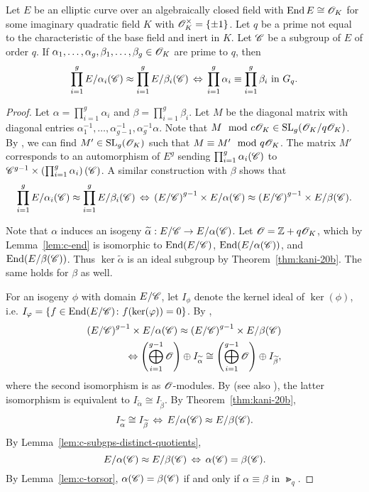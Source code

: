 \documentclass{amsart}
\begin{document}
\begin{lemma}\label{lem:prod-equiv-torsor}
  Let $E$ be an elliptic curve over an algebraically closed field with $\operatorname{End} E \cong \mathscr{O}_K$ for some imaginary quadratic field $K$ with $\mathscr{O}_K^\times = \{\pm 1\}$. Let $q$ be a prime not equal to the characteristic of the base field and inert in $K$. Let $\mathscr{C}$ be a subgroup of $E$ of order $q$. If $\alpha_1,\dots,\alpha_g,\beta_1,\dots,\beta_g \in \mathscr{O}_K$ are prime to $q$, then
  \[
    \prod_{i=1}^g E/\alpha_i(\mathscr{C}) \approx \prod_{i=1}^g E/\beta_i(\mathscr{C})
    \,\Leftrightarrow\,
    \prod_{i=1}^g \alpha_i \equiv \prod_{i=1}^g \beta_i \text{ in } G_q.
  \]
\end{lemma}
\begin{proof}
  Let $\alpha = \prod_{i=1}^g\alpha_i$ and $\beta = \prod_{i=1}^g\beta_i$. Let $M$ be the diagonal matrix with diagonal entries $\alpha_1^{-1},\dots,\alpha_{g-1}^{-1}, \alpha_g^{-1}\alpha$. Note that $M\mod{c\mathscr{O}_K} \in \operatorname{SL}_g(\mathscr{O}_K/q\mathscr{O}_K)$. By \cite[Cor.~5.2, Pg.~18]{ktheory1964bass}, we can find $M' \in \operatorname{SL}_g(\mathscr{O}_K)$ such that $M \equiv M' \mod{q\mathscr{O}_K}$. The matrix $M'$ corresponds to an automorphism of $E^g$ sending $\prod_{i=1}^g \alpha_i(\mathscr{C})$ to $\mathscr{C}^{g-1} \times \left(\prod_{i=1}^g \alpha_i\right)(\mathscr{C})$. A similar construction with $\beta$ shows that
  \[
    \prod_{i=1}^g E/\alpha_i(\mathscr{C}) \approx \prod_{i=1}^g E/\beta_i(\mathscr{C})
    \,\Leftrightarrow\,
    \left(E/\mathscr{C}\right)^{g-1} \times E/\alpha(\mathscr{C}) \approx \left(E/\mathscr{C}\right)^{g-1} \times E/\beta(\mathscr{C}).
  \]

  Note that $\alpha$ induces an isogeny $\widetilde{\alpha}: E/\mathscr{C} \to E/\alpha(\mathscr{C})$. Let $\mathscr{O} = \mathbb{Z} + q\mathscr{O}_K$, which by Lemma~\ref{lem:c-end} is isomorphic to $\operatorname{End}(E/\mathscr{C})$, $\operatorname{End}(E/\alpha(\mathscr{C}))$, and $\operatorname{End}(E/\beta(\mathscr{C}))$. Thus $\ker\tilde{\alpha}$ is an ideal subgroup by Theorem~\ref{thm:kani-20b}. The same holds for $\beta$ as well.

  For an isogeny $\phi$ with domain $E/\mathscr{C}$, let $I_\phi$ denote the kernel ideal of $\ker(\phi)$, i.e. $I_\varphi = \{f \in \operatorname{End}(E/\mathscr{C}) \colon f(\ker(\varphi)) = 0\}$.
  By \cite[Thm.~46]{kani2011products},
  \begin{align*}
    \left(E/\mathscr{C}\right)^{g-1} \times E/\alpha(\mathscr{C}) \approx \left(E/\mathscr{C}\right)^{g-1} \times E/\beta(\mathscr{C})
    \\
    \Leftrightarrow
    \left(\bigoplus_{i=1}^{g-1} \mathscr{O}\right) \oplus I_{\widetilde{\alpha}} \cong \left(\bigoplus_{i=1}^{g-1} \mathscr{O}\right) \oplus I_{\widetilde{\beta}},
  \end{align*}
  where the second isomorphism is as $\mathscr{O}$-modules. By \cite[Thm.~48]{kani2011products} (see also \cite[Rem.~49b]{kani2011products}), the latter isomorphism is equivalent to $I_{\tilde{\alpha}} \cong I_{\tilde{\beta}}$.
  By Theorem~\ref{thm:kani-20b},
  \[
    I_{\widetilde{\alpha}} \cong I_{\widetilde{\beta}}
    \,\Leftrightarrow\,
    E/\alpha(\mathscr{C}) \approx E/\beta(\mathscr{C}).
  \]
  By Lemma~\ref{lem:c-subgps-distinct-quotients},
  \[
    E/\alpha(\mathscr{C}) \approx E/\beta(\mathscr{C})
    \,\Leftrightarrow\,
    \alpha(\mathscr{C}) = \beta(\mathscr{C}).
  \]
  By Lemma~\ref{lem:c-torsor}, $\alpha(\mathscr{C}) = \beta(\mathscr{C})$ if and only if $\alpha \equiv \beta$ in $\Gt_q$.
\end{proof}
\end{document}
